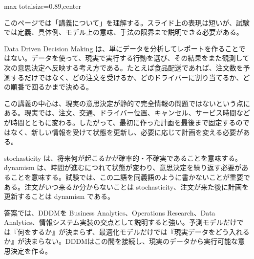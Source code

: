 \begin{minipage}[t]{0.58\textwidth}
\begin{adjustbox}{max totalsize={\textwidth}{0.89\textheight},center}
\begin{minipage}{\textwidth}\scriptsize
{}このページでは「講義について」を理解する。スライド上の表現は短いが、試験では定義、具体例、モデル上の意味、手法の限界まで説明できる必要がある。\par
Data Driven Decision Making は、単にデータを分析してレポートを作ることではない。データを使って、現実で実行する行動を選び、その結果をまた観測して次の意思決定へ反映する考え方である。たとえば食品配送であれば、注文数を予測するだけではなく、どの注文を受けるか、どのドライバーに割り当てるか、どの順番で回るかまで決める。\par
この講義の中心は、現実の意思決定が静的で完全情報の問題ではないという点にある。現実では、注文、交通、ドライバー位置、キャンセル、サービス時間などが時間とともに変わる。したがって、最初に作った計画を最後まで固定するのではなく、新しい情報を受けて状態を更新し、必要に応じて計画を変える必要がある。\par
stochasticity は、将来何が起こるかが確率的・不確実であることを意味する。dynamism は、時間が進むにつれて状態が変わり、意思決定を繰り返す必要があることを意味する。試験では、この二語を同義語のように書かないことが重要である。注文がいつ来るか分からないことは stochasticity、注文が来た後に計画を更新することは dynamism である。\par
答案では、DDDMを Business Analytics、Operations Research、Data Analytics、情報システム実装の交点として説明すると強い。予測モデルだけでは『何をするか』が決まらず、最適化モデルだけでは『現実データをどう入れるか』が決まらない。DDDMはこの間を接続し、現実のデータから実行可能な意思決定を作る。\par

\end{minipage}
\end{adjustbox}
\end{minipage}
